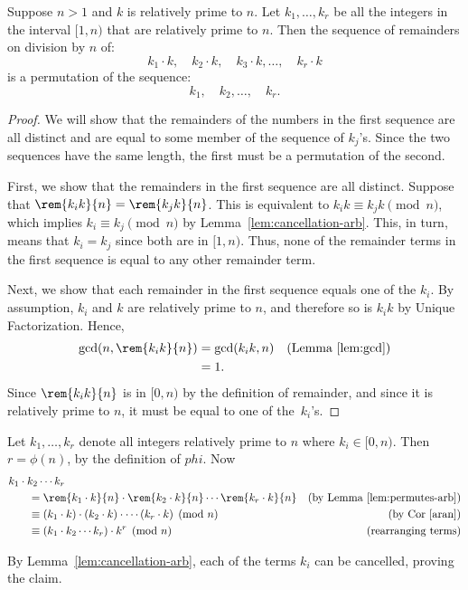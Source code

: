 \begin{editingnotes}

\begin{lemma} \label{lem:permutes-arb}
Suppose $n>1$ and $k$ is relatively prime to $n$.
Let $k_1, \dots, k_r$ be all the integers in the interval
$[1,n)$ that are relatively prime to $n$.  Then the sequence of
  remainders on division by $n$ of:
\[
k_1 \cdot k,\quad
k_2 \cdot k,\quad
k_3 \cdot k, \dots,\quad
k_r \cdot k
\]
is a permutation of the sequence:
\[
k_1,\quad k_2, \dots,\quad k_r.
\]
\end{lemma}

\begin{proof}
We will show that the remainders of the numbers in the first sequence
are all distinct and are equal to some member of the sequence of
$k_j$'s.  Since the two sequences have the same length, the first must
be a permutation of the second.

First, we show that the remainders in the first sequence are all
distinct.  Suppose that $\rem{k_i k}{n} = \rem{k_j k}{n}$.  This is
equivalent to $k_i k \equiv k_j k \pmod{n}$, which implies $k_i \equiv
k_j \pmod{n}$ by Lemma~\ref{lem:cancellation-arb}.  This, in turn,
means that $k_i = k_j$ since both are in $[1,n)$.  Thus, none
of the remainder terms in the first sequence is equal to any other
remainder term.

Next, we show that each remainder in the first sequence equals one of
the $k_i$.  By assumption, $k_i$ and $k$ are relatively prime to $n$,
and therefore so is $k_ik$ by Unique Factorization.  Hence,
\begin{align*}
\gcd(n, \rem{k_i k}{n}) & = \gcd(k_i k, n)
            & \text{(Lemma~\ref{lem:gcd})}\\
      & = 1.
\end{align*}
Since $\rem{k_i k}{n}$ is in $[0, n)$ by the definition of remainder,
  and since it is relatively prime to $n$, it must be equal to one of
  the~$k_i$'s.
\end{proof}

Let $k_1, \dots, k_r$ denote all integers relatively prime to $n$
where $ k_i\in [0, n)$.  Then $r = \phi(n)$, by the definition of
  $phi$.  Now
\begin{align*}
\lefteqn{k_1 \cdot k_2 \cdots k_r} \hspace{0.25in} \\
  & = \rem{k_1 \cdot k}{n} \cdot \rem{k_2 \cdot k}{n} \cdots \rem{k_r \cdot k}{n}
      & \text{(by Lemma~\ref{lem:permutes-arb})}\\
  & \equiv (k_1 \cdot k) \cdot (k_2 \cdot k) \cdot \cdots (k_r \cdot k) \pmod{n}
      & \text{(by Cor~\ref{aran})}\\
  & \equiv (k_1 \cdot k_2 \cdots k_r) \cdot k^r \pmod{n}
      & \text{(rearranging terms)}
\end{align*}

By Lemma~\ref{lem:cancellation-arb}, each of the terms $k_i$ can be cancelled, proving the
claim.
\end{editingnotes}


